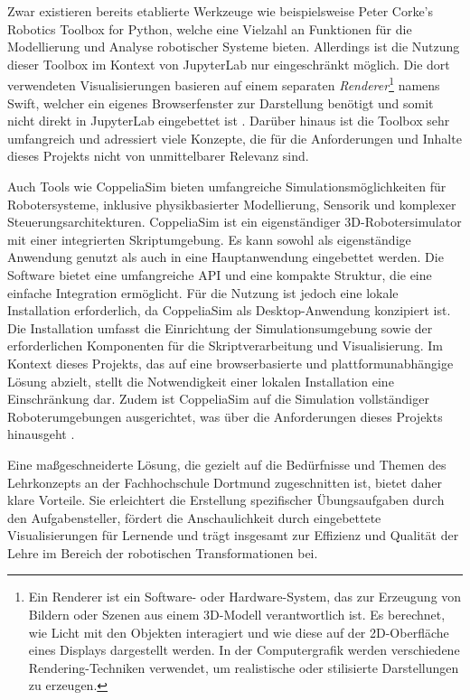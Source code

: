 Zwar existieren bereits etablierte Werkzeuge wie beispielsweise Peter Corke’s Robotics Toolbox for Python, welche eine Vielzahl an Funktionen für die Modellierung und Analyse robotischer Systeme bieten.
Allerdings ist die Nutzung dieser Toolbox im Kontext von JupyterLab nur eingeschränkt möglich.
Die dort verwendeten Visualisierungen basieren auf einem separaten \textit{Renderer}\footnote{Ein Renderer ist ein Software- oder Hardware-System,
das zur Erzeugung von Bildern oder Szenen aus einem 3D-Modell verantwortlich ist. Es berechnet, wie Licht mit den Objekten interagiert und wie diese auf der 2D-Oberfläche eines Displays dargestellt werden.
In der Computergrafik werden verschiedene Rendering-Techniken verwendet, um realistische oder stilisierte Darstellungen zu erzeugen.} namens Swift,
welcher ein eigenes Browserfenster zur Darstellung benötigt und somit nicht direkt in JupyterLab eingebettet ist .
Darüber hinaus ist die Toolbox sehr umfangreich und adressiert viele Konzepte, die für die Anforderungen und Inhalte dieses Projekts nicht von unmittelbarer Relevanz sind.

Auch Tools wie CoppeliaSim bieten umfangreiche Simulationsmöglichkeiten für Robotersysteme,
inklusive physikbasierter Modellierung, Sensorik und komplexer Steuerungsarchitekturen.
CoppeliaSim ist ein eigenständiger 3D-Robotersimulator mit einer integrierten Skriptumgebung.
Es kann sowohl als eigenständige Anwendung genutzt als auch in eine Hauptanwendung eingebettet werden.
Die Software bietet eine umfangreiche API und eine kompakte Struktur, die eine einfache Integration ermöglicht.
Für die Nutzung ist jedoch eine lokale Installation erforderlich, da CoppeliaSim als Desktop-Anwendung konzipiert ist.
Die Installation umfasst die Einrichtung der Simulationsumgebung sowie der erforderlichen Komponenten für die Skriptverarbeitung und Visualisierung. 
Im Kontext dieses Projekts, das auf eine browserbasierte und plattformunabhängige Lösung abzielt, stellt die Notwendigkeit einer lokalen Installation eine Einschränkung dar.
Zudem ist CoppeliaSim auf die Simulation vollständiger Roboterumgebungen ausgerichtet, was über die Anforderungen dieses Projekts hinausgeht .

Eine maßgeschneiderte Lösung, die gezielt auf die Bedürfnisse und Themen des Lehrkonzepts an der Fachhochschule Dortmund zugeschnitten ist, bietet daher klare Vorteile.
Sie erleichtert die Erstellung spezifischer Übungsaufgaben durch den Aufgabensteller,
fördert die Anschaulichkeit durch eingebettete Visualisierungen für Lernende und trägt insgesamt zur Effizienz und Qualität der Lehre im Bereich der robotischen Transformationen bei.

